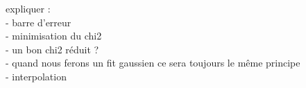 \documentclass[11pt,a4paper]{article}
\begin{document}
%
%
expliquer : \\
- barre d'erreur\\
- minimisation du chi2\\
- un bon chi2 réduit ?\\
- quand nous ferons un fit gaussien ce sera toujours le même principe\\
- interpolation \cite{scipyInterp}\\
\end{document}
